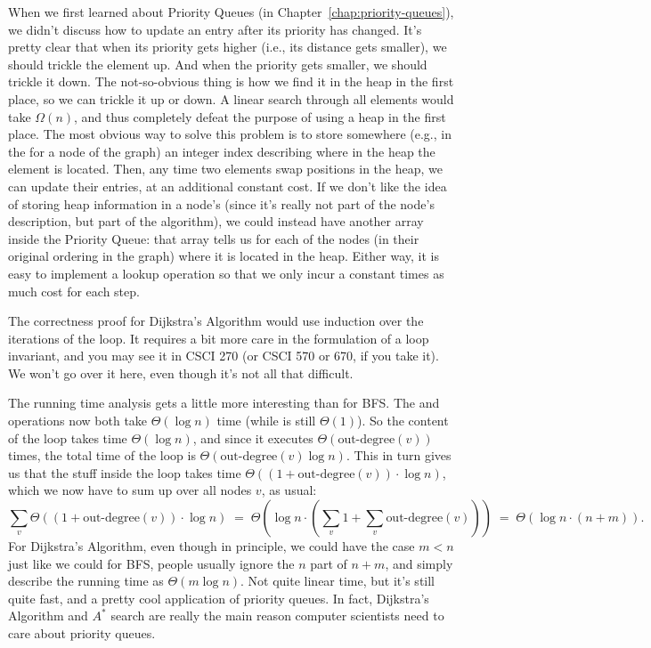 When we first learned about Priority Queues (in
Chapter~\ref{chap:priority-queues}), we didn't discuss how to update
an entry after its priority has changed. It's pretty clear that
when its priority gets higher (i.e., its distance gets smaller), we
should trickle the element up. And when the priority gets smaller, we
should trickle it down. The not-so-obvious thing is how we find it in
the heap in the first place, so we can trickle it up or down.
A linear search through all elements would take $\Omega(n)$, and thus
completely defeat the purpose of using a heap in the first place.
The most obvious way to solve this problem is to store somewhere
(e.g., in the  for a node of the graph) an integer
index describing where in the heap the element is located. Then, any
time two elements swap positions in the heap, we can update their
entries, at an additional constant cost. 
If we don't like the idea of storing heap information in a node's
 (since it's really not part of the node's description,
but part of the algorithm), we could instead have another array inside
the Priority Queue: that array tells us for each of the nodes (in
their original ordering in the graph) where it is located in the
heap. Either way, it is easy to implement a lookup operation so that
we only incur a constant times as much cost for each step.

The correctness proof for Dijkstra's Algorithm would use induction
over the iterations of the  loop. 
It requires a bit more care in the formulation
of a loop invariant, and you may see it in CSCI 270 (or CSCI 570 or
670, if you take it). We won't go over it here, even though it's not
all that difficult.

The running time analysis gets a little more interesting than for BFS. 
The  and  operations now both take
$\Theta(\log n)$ time (while  is still $\Theta(1)$).
So the content of the  loop takes time $\Theta(\log n)$, and
since it executes $\Theta(\mbox{out-degree}(v))$ times, the total time
of the  loop is $\Theta(\mbox{out-degree}(v) \log n)$.
This in turn gives us that the stuff inside the  loop
takes time $\Theta((1+\mbox{out-degree}(v)) \cdot \log n)$, which we
now have to sum up over all nodes $v$, as usual:
\[
\sum_v \Theta((1+\mbox{out-degree}(v)) \cdot \log n)
\; = \; \Theta(\log n \cdot (\sum_v 1 + \sum_v \mbox{out-degree}(v)))
\; = \; \Theta(\log n \cdot (n+m)).
\]
For Dijkstra's Algorithm, even though in principle, we could have the
case $m < n$ just like we could for BFS, people usually ignore the $n$
part of $n+m$, and simply describe the running time as $\Theta(m \log n)$.
Not quite linear time, but it's still quite fast, and a pretty cool
application of priority queues. In fact, Dijkstra's Algorithm and
$A^*$ search are really the main reason computer scientists
need to care about priority queues.

